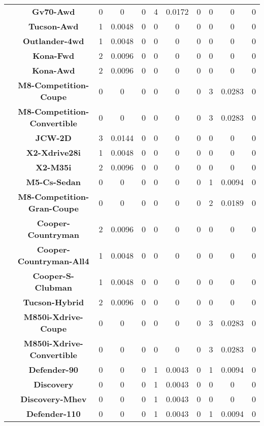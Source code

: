 \begin{center}
\begin{tabular}{|c|c||@{\hspace{1ex}}||c|c|c||@{\hspace{1ex}}||c|c|c||@{\hspace{1ex}}||c|c|c||@{\hspace{1ex}}||}
\cline{2-11}
  & {\bf Gv70-Awd} & 0 & 0 & 0 & 4 & 0.0172 & 0 & 0 & 0 & 0 \\
\cline{2-11}
  & {\bf Tucson-Awd} & 1 & 0.0048 & 0 & 0 & 0 & 0 & 0 & 0 & 0 \\
\cline{2-11}
  & {\bf Outlander-4wd} & 1 & 0.0048 & 0 & 0 & 0 & 0 & 0 & 0 & 0 \\
\cline{2-11}
  & {\bf Kona-Fwd} & 2 & 0.0096 & 0 & 0 & 0 & 0 & 0 & 0 & 0 \\
\cline{2-11}
  & {\bf Kona-Awd} & 2 & 0.0096 & 0 & 0 & 0 & 0 & 0 & 0 & 0 \\
\cline{2-11}
  & {\bf M8-Competition-Coupe} & 0 & 0 & 0 & 0 & 0 & 0 & 3 & 0.0283 & 0 \\
\cline{2-11}
  & {\bf M8-Competition-Convertible} & 0 & 0 & 0 & 0 & 0 & 0 & 3 & 0.0283 & 0 \\
\cline{2-11}
  & {\bf JCW-2D} & 3 & 0.0144 & 0 & 0 & 0 & 0 & 0 & 0 & 0 \\
\cline{2-11}
  & {\bf X2-Xdrive28i} & 1 & 0.0048 & 0 & 0 & 0 & 0 & 0 & 0 & 0 \\
\cline{2-11}
  & {\bf X2-M35i} & 2 & 0.0096 & 0 & 0 & 0 & 0 & 0 & 0 & 0 \\
\cline{2-11}
  & {\bf M5-Cs-Sedan} & 0 & 0 & 0 & 0 & 0 & 0 & 1 & 0.0094 & 0 \\
\cline{2-11}
  & {\bf M8-Competition-Gran-Coupe} & 0 & 0 & 0 & 0 & 0 & 0 & 2 & 0.0189 & 0 \\
\cline{2-11}
  & {\bf Cooper-Countryman} & 2 & 0.0096 & 0 & 0 & 0 & 0 & 0 & 0 & 0 \\
\cline{2-11}
  & {\bf Cooper-Countryman-All4} & 1 & 0.0048 & 0 & 0 & 0 & 0 & 0 & 0 & 0 \\
\cline{2-11}
  & {\bf Cooper-S-Clubman} & 1 & 0.0048 & 0 & 0 & 0 & 0 & 0 & 0 & 0 \\
\cline{2-11}
  & {\bf Tucson-Hybrid} & 2 & 0.0096 & 0 & 0 & 0 & 0 & 0 & 0 & 0 \\
\cline{2-11}
  & {\bf M850i-Xdrive-Coupe} & 0 & 0 & 0 & 0 & 0 & 0 & 3 & 0.0283 & 0 \\
\cline{2-11}
  & {\bf M850i-Xdrive-Convertible} & 0 & 0 & 0 & 0 & 0 & 0 & 3 & 0.0283 & 0 \\
\cline{2-11}
  & {\bf Defender-90} & 0 & 0 & 0 & 1 & 0.0043 & 0 & 1 & 0.0094 & 0 \\
\cline{2-11}
  & {\bf Discovery} & 0 & 0 & 0 & 1 & 0.0043 & 0 & 0 & 0 & 0 \\
\cline{2-11}
  & {\bf Discovery-Mhev} & 0 & 0 & 0 & 1 & 0.0043 & 0 & 0 & 0 & 0 \\
\cline{2-11}
  & {\bf Defender-110} & 0 & 0 & 0 & 1 & 0.0043 & 0 & 1 & 0.0094 & 0 \\

\end{tabular}
\end{center}
